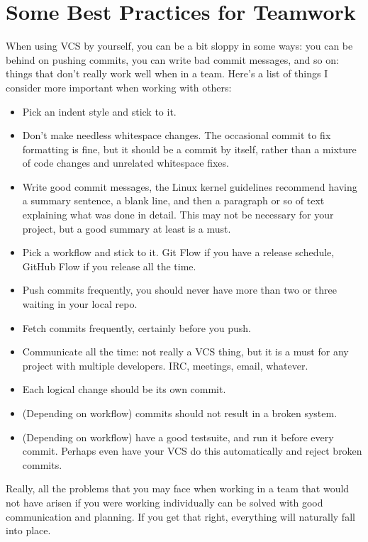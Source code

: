 \documentclass[12pt,a4paper]{article}
\begin{document}
\pagebreak
\section{Some Best Practices for Teamwork}

When using VCS by yourself, you can be a bit sloppy in some ways: you
can be behind on pushing commits, you can write bad commit messages,
and so on: things that don't really work well when in a team. Here's a
list of things I consider more important when working with others:

\begin{itemize}
  \item Pick an indent style and stick to it.
  \item Don't make needless whitespace changes. The occasional commit
    to fix formatting is fine, but it should be a commit by itself,
    rather than a mixture of code changes and unrelated whitespace
    fixes.
  \item Write good commit messages, the Linux kernel guidelines
    recommend having a summary sentence, a blank line, and then a
    paragraph or so of text explaining what was done in detail. This
    may not be necessary for your project, but a good summary at least
    is a must.
  \item Pick a workflow and stick to it. Git Flow if you have a
    release schedule, GitHub Flow if you release all the time.
  \item Push commits frequently, you should never have more than two
    or three waiting in your local repo.
  \item Fetch commits frequently, certainly before you push.
  \item Communicate all the time: not really a VCS thing, but it is a
    must for any project with multiple developers. IRC, meetings,
    email, whatever.
  \item Each logical change should be its own commit.
  \item (Depending on workflow) commits should not result in a broken
    system.
  \item (Depending on workflow) have a good testsuite, and run
    it before every commit. Perhaps even have your VCS do this
    automatically and reject broken commits.
\end{itemize}

Really, all the problems that you may face when working in a team that
would not have arisen if you were working individually can be solved
with good communication and planning. If you get that right,
everything will naturally fall into place.
\end{document}
